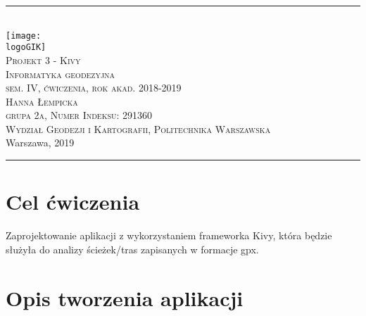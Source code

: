 \documentclass[10pt,a4paper]{article}
\newcommand{\logoGIK}{WGiK-znak.png}
\newcommand{\authorName}{Hanna Łempicka  \\ grupa 2a, Numer Indeksu: 291360}
\newcommand{\titeReport}{Projekt 3 - Kivy} %
\newcommand{\titleLecture}{Informatyka geodezyjna \\ sem. IV, ćwiczenia, rok akad. 2018-2019} %
\newcommand{\faculty}{Wydział Geodezji i Kartografii}
\newcommand{\university}{Politechnika Warszawska}
\newcommand{\city}{Warszawa}
\newcommand{\thisyear}{2019}
\begin{document}
	\begin{center} 
		\rule{\textwidth}{.5pt} \\
		\vspace{1.0cm}
		\texttt{[image: \\logoGIK]}
		\vspace{0.5cm} \\
		\Large \textsc{\titeReport}
		\vspace{0.5cm} \\  
		\large \textsc{\titleLecture}
		\vspace{0.5cm}\\
		\textsc{\authorName}  \\
		\textsc{\faculty}, \textsc{\university}  \\ 
		\city, \thisyear
	\end{center} 
	\rule{\textwidth}{1.5pt}
	
	\tableofcontents 								%

\newpage
\section{Cel ćwiczenia}
Zaprojektowanie aplikacji z wykorzystaniem frameworka Kivy, która będzie służyła do analizy ścieżek/tras zapisanych w formacje gpx. 

\section{Opis tworzenia aplikacji}
\end{document}
